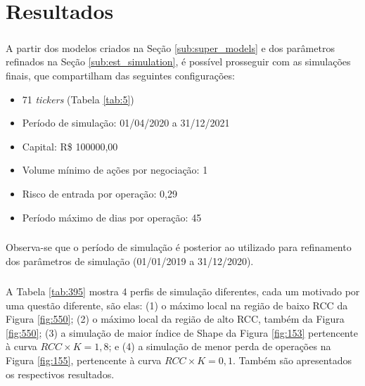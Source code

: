 \chapter{Resultados}
\label{cap4}



\paragraph{} A partir dos modelos criados na Seção \ref{sub:super_models} e dos parâmetros refinados na Seção \ref{sub:est_simulation}, é possível prosseguir com as simulações finais, que compartilham das seguintes configurações:

\begin{itemize}
    \item 71 \textit{tickers} (Tabela \ref{tab:5})
    \item Período de simulação: 01/04/2020 a 31/12/2021
    \item Capital: R\$ 100000,00
    \item Volume mínimo de ações por negociação: 1
    \item Risco de entrada por operação: 0,29
    \item Período máximo de dias por operação: 45
\end{itemize}

\paragraph{} Observa-se que o período de simulação é posterior ao utilizado para refinamento dos parâmetros de simulação (01/01/2019 a 31/12/2020).

\paragraph{} A Tabela \ref{tab:395} mostra 4 perfis de simulação diferentes, cada um motivado por uma questão diferente, são elas: (1) o máximo local na região de baixo RCC da Figura \ref{fig:550}; (2) o máximo local da região de alto RCC, também da Figura \ref{fig:550}; (3) a simulação de maior índice de Shape da Figura \ref{fig:153} pertencente à curva \begin{math} RCC \times K = 1,8 \end{math}; e (4) a simulação de menor perda de operações na Figura \ref{fig:155}, pertencente à curva \begin{math} RCC \times K = 0,1 \end{math}. Também são apresentados os respectivos resultados.


